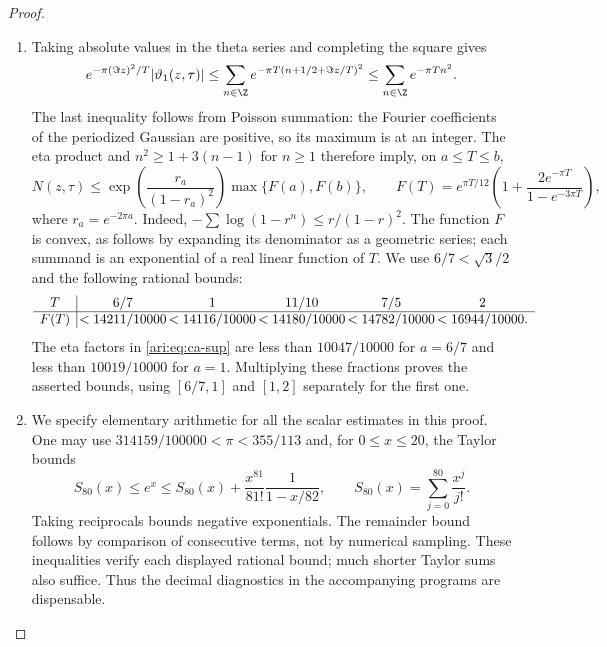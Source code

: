\begin{proof}
\begin{enumerate}[label=\arabic*.,leftmargin=*]
\item Taking absolute values in the theta series and completing the square
gives
\[
 e^{-\pi(\Im z)^2/T}|\vartheta_1(z,\tau)|
 \le\sum_{n\in\Z}
 e^{-\pi T(n+1/2+\Im z/T)^2}
 \le\sum_{n\in\Z}e^{-\pi Tn^2}.
\]
The last inequality follows from Poisson summation: the Fourier
coefficients of the periodized Gaussian are positive, so its maximum
is at an integer. The eta product and $n^2\ge1+3(n-1)$ for $n\ge1$
therefore imply, on $a\le T\le b$,
\begin{equation}\label{ari:eq:ca-sup}
 N(z,\tau)\le
 \exp\!\left(\frac{r_a}{(1-r_a)^2}\right)
 \max\{F(a),F(b)\},\qquad
 F(T)=e^{\pi T/12}
 \left(1+\frac{2e^{-\pi T}}{1-e^{-3\pi T}}\right),
\end{equation}
where $r_a=e^{-2\pi a}$. Indeed,
$-\sum\log(1-r^n)\le r/(1-r)^2$. The function $F$ is convex,
as follows by expanding its denominator as a geometric series;
each summand is an exponential of a real linear function of $T$.
We use $6/7<\sqrt3/2$ and the following rational bounds:
\[
\begin{array}{c|@{\,}c@{\,}c@{\,}c@{\,}c@{\,}c}
T&6/7&1&11/10&7/5&2\\ \hline
F(T)&<14211/10000&<14116/10000&<14180/10000&<14782/10000&<16944/10000.
\end{array}
\]
The eta factors in \eqref{ari:eq:ca-sup} are less than $10047/10000$
for $a=6/7$ and less than $10019/10000$ for $a=1$.
Multiplying these fractions proves the asserted bounds, using
$[6/7,1]$ and $[1,2]$ separately for the first one.

\item We specify elementary arithmetic for all the scalar estimates in
this proof. One may use $314159/100000<\pi<355/113$ and, for
$0\le x\le20$, the Taylor bounds
\begin{equation}\label{ari:eq:ca-exp}
 S_{80}(x)\le e^x\le
 S_{80}(x)+\frac{x^{81}}{81!}\frac1{1-x/82},
 \qquad S_{80}(x)=\sum_{j=0}^{80}\frac{x^j}{j!}.
\end{equation}
Taking reciprocals bounds negative exponentials. The remainder
bound follows by comparison of consecutive terms, not by numerical
sampling. These inequalities verify each displayed rational bound;
much shorter Taylor sums also suffice. Thus the decimal diagnostics
in the accompanying programs are dispensable.


\end{enumerate}
\end{proof}
